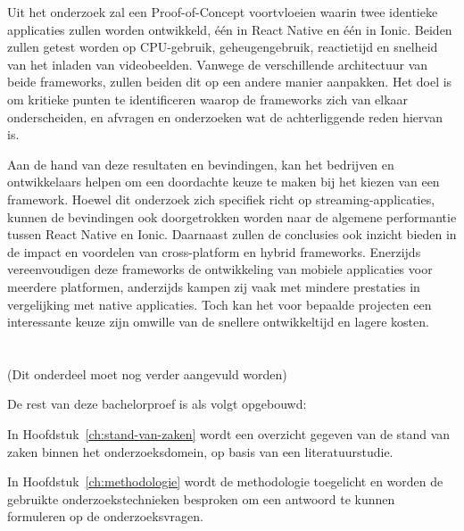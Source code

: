 Uit het onderzoek zal een Proof-of-Concept voortvloeien waarin twee identieke applicaties zullen worden ontwikkeld, één in React Native en één in Ionic. Beiden zullen getest worden op CPU-gebruik, geheugengebruik, reactietijd en snelheid van het inladen van videobeelden. Vanwege de verschillende architectuur van beide frameworks, zullen beiden dit op een andere manier aanpakken. Het doel is om kritieke punten te identificeren waarop de frameworks zich van elkaar onderscheiden, en afvragen en onderzoeken wat de achterliggende reden hiervan is.

Aan de hand van deze resultaten en bevindingen, kan het bedrijven en ontwikkelaars helpen om een doordachte keuze te maken bij het kiezen van een framework. Hoewel dit onderzoek zich specifiek richt op streaming-applicaties, kunnen de bevindingen ook doorgetrokken worden naar de algemene performantie tussen React Native en Ionic. Daarnaast zullen de conclusies ook inzicht bieden in de impact en voordelen van cross-platform en hybrid frameworks. Enerzijds vereenvoudigen deze frameworks de ontwikkeling van mobiele applicaties voor meerdere platformen, anderzijds kampen zij vaak met mindere prestaties in vergelijking met native applicaties. Toch kan het voor bepaalde projecten een interessante keuze zijn omwille van de snellere ontwikkeltijd en lagere kosten.

\section{}%
\label{sec:opzet-bachelorproef}


(Dit onderdeel moet nog verder aangevuld worden)

De rest van deze bachelorproef is als volgt opgebouwd: 

In Hoofdstuk~\ref{ch:stand-van-zaken} wordt een overzicht gegeven van de stand van zaken binnen het onderzoeksdomein, op basis van een literatuurstudie.

In Hoofdstuk~\ref{ch:methodologie} wordt de methodologie toegelicht en worden de gebruikte onderzoekstechnieken besproken om een antwoord te kunnen formuleren op de onderzoeksvragen.


